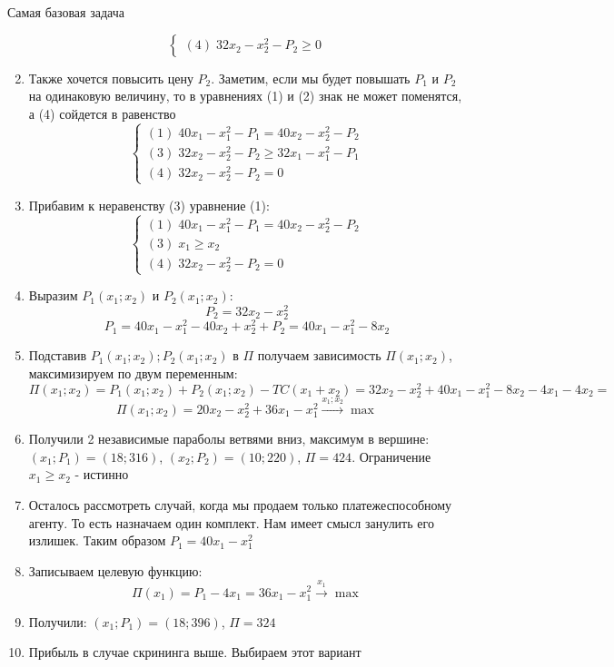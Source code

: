 \begin{mybox}{Самая базовая задача}
\begin{enumerate}
\begin{equation*}
\begin{cases}
           (4)\;32x_2-x_2^2-P_2\geq 0
         \end{cases}
        \end{equation*}
        \item Также хочется повысить цену $P_2$. Заметим, если мы будет повышать $P_1$ и $P_2$ на одинаковую величину, то в уравнениях (1) и (2) знак не может поменятся, а (4) сойдется в равенство
        \begin{equation*}
         \begin{cases}
           (1)\;40x_1-x_1^2-P_1= 40x_2-x_2^2-P_2
           \\
           (3)\;32x_2-x_2^2-P_2\geq 32x_1-x_1^2-P_1
           \\
           (4)\;32x_2-x_2^2-P_2= 0
         \end{cases}
        \end{equation*}
        \item Прибавим к неравенству (3) уравнение (1):
        \begin{equation*}
         \begin{cases}
           (1)\;40x_1-x_1^2-P_1= 40x_2-x_2^2-P_2
           \\
           (3)\;x_1\geq x_2
           \\
           (4)\;32x_2-x_2^2-P_2= 0
         \end{cases}
        \end{equation*}
        \item Выразим $P_1(x_1;x_2)$ и $P_2(x_1;x_2)$:
        $$P_2=32x_2-x_2^2$$
        $$P_1=40x_1-x_1^2-40x_2+x_2^2+P_2=40x_1-x_1^2-8x_2$$
        \item Подставив $P_1(x_1;x_2);P_2(x_1;x_2)$ в $\Pi$ получаем зависимость $\Pi(x_1;x_2)$, максимизируем по двум переменным:
        $$\Pi(x_1;x_2)=P_1(x_1;x_2)+P_2(x_1;x_2)-TC(x_1+x_2)=32x_2-x_2^2+40x_1-x_1^2-8x_2-4x_1-4x_2=$$
        $$\Pi(x_1;x_2)=20x_2-x_2^2+36x_1-x_1^2\xrightarrow{x_1;x_2} \max$$
        \item Получили 2 независимые параболы ветвями вниз, максимум в вершине: $(x_1;P_1)=(18;316)$, $(x_2;P_2)=(10;220)$, $\Pi=424$. Ограничение $x_1\geq x_2$ - истинно
        \item Осталось рассмотреть случай, когда мы продаем только платежеспособному агенту. То есть назначаем один комплект. Нам имеет смысл занулить его излишек. Таким образом $P_1=40x_1-x_1^2$
        \item Записываем целевую функцию: $$\Pi(x_1)=P_1-4x_1=36x_1-x_1^2 \xrightarrow{x_1} \max$$
        \item Получили: $(x_1;P_1)=(18;396)$, $\Pi=324$
        \item Прибыль в случае скрининга выше. Выбираем этот вариант
    \end{enumerate}
\end{mybox}

